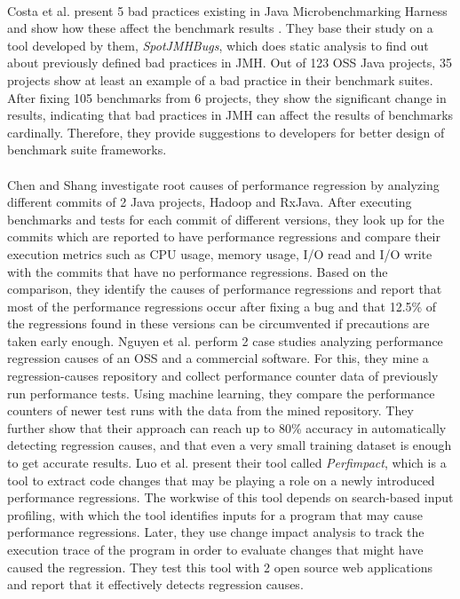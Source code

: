 \documentclass{seal_thesis}
\begin{document}
\\
Costa et al. present 5 bad practices existing in Java Microbenchmarking Harness and show how these affect the benchmark results \cite{costa2019}. They base their study on a tool developed by them, \textit{SpotJMHBugs}, which does static analysis to find out about previously defined bad practices in JMH. Out of 123 OSS Java projects, 35 projects show at least an example of a bad practice in their benchmark suites. After fixing 105 benchmarks from 6 projects, they show the significant change in results, indicating that bad practices in JMH can affect the results of benchmarks cardinally. Therefore, they provide suggestions to developers for better design of benchmark suite frameworks.\\
\\
Chen and Shang \cite{chenshang} investigate root causes of performance regression by analyzing different commits of 2 Java projects, Hadoop and RxJava. After executing benchmarks and tests for each commit of different versions, they look up for the commits which are reported to have performance regressions and compare their execution metrics such as CPU usage, memory usage, I/O read and I/O write with the commits that have no performance regressions. Based on the comparison, they identify the causes of performance regressions and report that most of the performance regressions occur after fixing a bug and that 12.5\% of the regressions found in these versions can be circumvented if precautions are taken early enough. Nguyen et al. \cite{Nguyen:2014:ICS:2597073.2597092} perform 2 case studies analyzing performance regression causes of an OSS and a commercial software. For this, they mine a regression-causes repository and collect performance counter data of previously run performance tests. Using machine learning, they compare the performance counters of newer test runs with the data from the mined repository. They further show that their approach can reach up to 80\% accuracy in automatically detecting regression causes, and that even a very small training dataset is enough to get accurate results. Luo et al. \cite{Luo} present their tool called \textit{Perfimpact}, which is a tool to extract code changes that may be playing a role on a newly introduced performance regressions. The workwise of this tool depends on search-based input profiling, with which the tool identifies inputs for a program that may cause performance regressions. Later, they use change impact analysis to track the execution trace of the program in order to evaluate changes that might have caused the regression. They test this tool with 2 open source web applications and report that it effectively detects regression causes.\\
\end{document}
